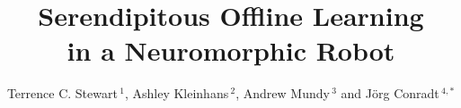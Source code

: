 \documentclass{frontiersSCNS}
\def\firstAuthorLast{Stewart {et~al.}} %
\def\Authors{Terrence C. Stewart\,$^{1}$, Ashley Kleinhans\,$^{2}$, Andrew Mundy\,$^{3}$ and J{\"o}rg Conradt\,$^{4,*}$}
\begin{document}
\onecolumn
{}

%
\title[Serendipitous Offline Learning in a Neuromorphic Robot]{Serendipitous Offline Learning\\in a Neuromorphic Robot}

\author[\firstAuthorLast ]{\Authors} %
\address{} %
\correspondance{} %

\extraAuth{}%

\maketitle
\end{document}
